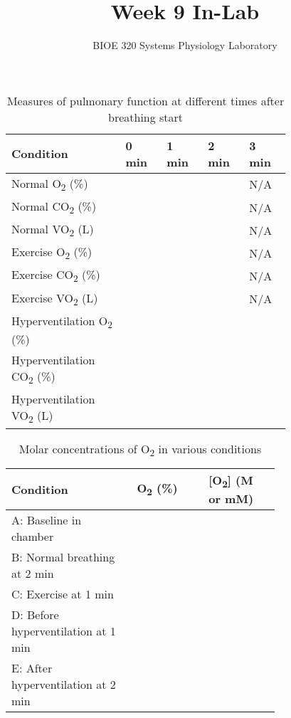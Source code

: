 \documentclass{article}
\title{Week 9 In-Lab}
\author{BIOE 320 Systems Physiology Laboratory}
\date{}
\begin{document}
\large
\maketitle

\begin{itemize}
	\begin{table}[h]
	\centering
	\caption{Measures of pulmonary function at different times after breathing start}
	\begin{tabular}[h!]{p{0.3\linewidth}p{0.12\linewidth}p{0.12\linewidth}p{0.12\linewidth}p{0.12\linewidth}}
	\toprule
	Condition & 0 min & 1 min & 2 min & 3 min\\
	\midrule
	Normal O\textsubscript{2} (\%) & & & & N/A\\\midrule
	Normal CO\textsubscript{2} (\%) & & & & N/A\\\midrule
	Normal VO\textsubscript{2} (L) & & & & N/A\\\midrule
	Exercise O\textsubscript{2} (\%) & & & & N/A\\\midrule
	Exercise CO\textsubscript{2} (\%) & & & & N/A\\\midrule
	Exercise VO\textsubscript{2} (L) & & & & N/A\\\midrule
	Hyperventilation O\textsubscript{2} (\%) & & & & \\\midrule
	Hyperventilation CO\textsubscript{2} (\%) & & & & \\\midrule
	Hyperventilation VO\textsubscript{2} (L) & & & & \\
	\bottomrule
	\end{tabular}
	\end{table}\vspace{0cm}
	
	\begin{table}[h]
	\centering
	\caption{Molar concentrations of O\textsubscript{2} in various conditions}
	\begin{tabular}[h!]{p{0.35\linewidth}p{0.2\linewidth}p{0.2\linewidth}}
	\toprule
	Condition & O\textsubscript{2} (\%) & [O\textsubscript{2}] (M or mM)\\\midrule
	A: Baseline in chamber & & \\\midrule
	B: Normal breathing at 2 min & & \\\midrule
	C: Exercise at 1 min & & \\\midrule
	D: Before hyperventilation at 1 min & & \\\midrule
	E: After hyperventilation at 2 min & & \\
	\bottomrule
	\end{tabular}
	\end{table}\vspace{0cm}
	

\end{itemize}
\end{document}
